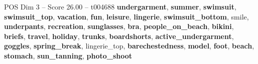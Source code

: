 \begin{textsample}{POS Dim 3 – Score 26.00 – t004688}  \label{ex:f3_pos_011}
\textbf{undergarment}, \textbf{summer}, \textbf{swimsuit}, \textbf{swimsuit\_top}, \textbf{vacation}, \textbf{fun}, \textbf{leisure}, \textbf{lingerie}, \textbf{swimsuit\_bottom}, smile, \textbf{underpants}, \textbf{recreation}, \textbf{sunglasses}, \textbf{bra}, \textbf{people\_on\_beach}, \textbf{bikini}, \textbf{briefs}, \textbf{travel}, \textbf{holiday}, \textbf{trunks}, \textbf{boardshorts}, \textbf{active\_undergarment}, \textbf{goggles}, \textbf{spring\_break}, lingerie\_top, \textbf{barechestedness}, \textbf{model}, \textbf{foot}, \textbf{beach}, \textbf{stomach}, \textbf{sun\_tanning}, \textbf{photo\_shoot}

\end{textsample}
